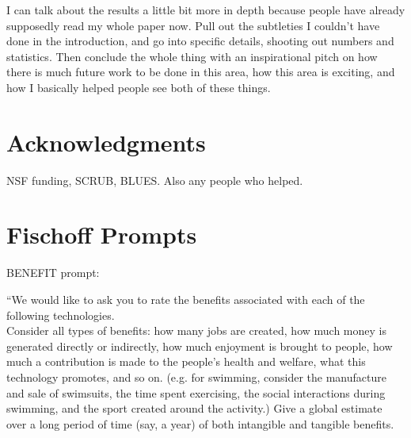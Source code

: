 \documentclass{acm_proc_article-sp}
\begin{document}
I can talk about the results a little bit more in depth because people have already supposedly read my whole paper now. Pull out the subtleties I couldn't have done in the introduction, and go into specific details, shooting out numbers and statistics. Then conclude the whole thing with an inspirational pitch on how there is much future work to be done in this area, how this area is exciting, and how I basically helped people see both of these things. 


\section{Acknowledgments}
NSF funding, SCRUB, BLUES. Also any people who helped.







\appendix
\section{Fischoff Prompts}
\label{sec:prompt}

BENEFIT prompt: 


``We would like to ask you to rate the benefits associated with each of the following technologies.  \\[-.6cm]

Consider all types of benefits: how many jobs are created, how much money is generated directly or indirectly, how much enjoyment is brought to people, how much a contribution is made to the people's health and welfare, what this technology promotes, and so on. (e.g. for swimming, consider the manufacture and sale of swimsuits, the time spent exercising, the social interactions during swimming, and the sport created around the activity.) Give a global estimate over a long period of time (say, a year) of both intangible and tangible benefits. \\[-.6cm]
\end{document}
